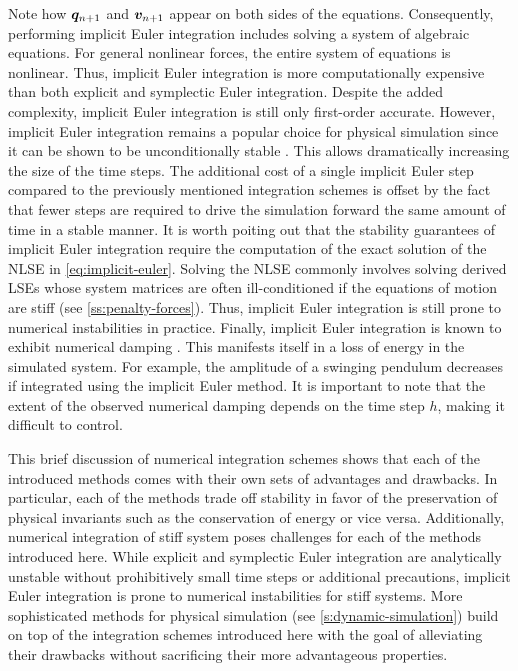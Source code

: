 \noindent Note how $\bm{q}_{n+1}$ and $\bm{v}_{n+1}$ appear on both sides of the equations. Consequently, performing implicit 
Euler integration includes solving a system of algebraic equations. For general nonlinear forces, the entire system of equations is nonlinear.
Thus, implicit Euler integration is more computationally expensive than both explicit and symplectic Euler integration. 
Despite the added complexity, implicit Euler integration is still only first-order accurate. However, implicit Euler integration 
remains a popular choice for physical simulation since it can be shown to be unconditionally stable \cite{chapra2005}. This allows 
dramatically increasing the size of the time steps. The additional cost of a single implicit Euler 
step compared to the previously mentioned integration schemes is offset by the fact that fewer steps are required to drive the 
simulation forward the same amount of time in a stable manner. It is worth poiting out that the stability guarantees of implicit Euler 
integration require the computation of the exact solution of the NLSE in \autoref{eq:implicit-euler}. Solving the NLSE commonly involves
solving derived LSEs whose system matrices are often ill-conditioned if the equations of motion are stiff (see \cref{ss:penalty-forces}). 
Thus, implicit Euler integration is still prone to numerical instabilities in practice. Finally, implicit Euler integration is known 
to exhibit numerical 
damping \cite{stern2006}. This manifests itself in a loss of energy in the simulated system. For example, the amplitude of a swinging 
pendulum decreases if integrated using the implicit Euler method. It is important to note that the extent of the observed numerical damping
depends on the time step $h$, making it difficult to control.

This brief discussion of numerical integration schemes shows that each of the introduced methods comes with their own sets of advantages and
drawbacks. In particular, each of the methods trade off stability in favor of the preservation of physical invariants such as the conservation
of energy or vice versa. Additionally, numerical integration of stiff system poses challenges for each of the methods introduced here. While
explicit and symplectic Euler integration are analytically unstable without prohibitively small time steps or additional
precautions, implicit Euler integration is prone to numerical instabilities for stiff systems. More sophisticated methods for physical 
simulation (see \cref{s:dynamic-simulation}) build on top of the integration schemes introduced here with the goal of alleviating their 
drawbacks without sacrificing their more advantageous properties. 

